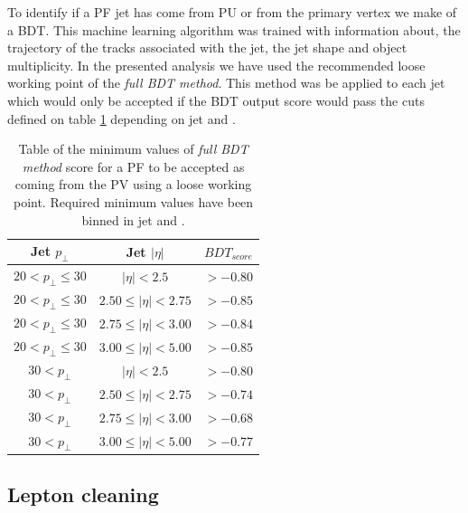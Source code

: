 To identify if a \gls{PF} jet has come from \gls{PU} or from the primary vertex we make of a \gls{BDT}. This machine learning algorithm was trained with information about, the trajectory of the tracks associated with the jet, the jet shape and object multiplicity. In the presented analysis we have used the recommended loose working point of the \textit{full \gls{BDT} method}. This method was be applied to each jet which would only be accepted if the \gls{BDT} output score would pass the cuts defined on table \ref{TABLE:EventReconstructionAndSimulation_PileupJetIDFullBDTLooseWorkingPoint} depending on jet \pt and \eta.

\begin{table}[!htb]
\centering
\begin{tabular}{|c|c|c|}
\hline
Jet $p_{\perp}$ & Jet $|\eta|$ & $BDT_{score}$ \\
\hline \hline
$20 < p_{\perp} \leq 30$ & $|\eta| < 2.5$            & $> -0.80$ \\
$20 < p_{\perp} \leq 30$ & $2.50 \leq |\eta| < 2.75$ & $> -0.85$ \\
$20 < p_{\perp} \leq 30$ & $2.75 \leq |\eta| < 3.00$ & $> -0.84$ \\
$20 < p_{\perp} \leq 30$ & $3.00 \leq |\eta| < 5.00$ & $> -0.85$ \\
$30 < p_{\perp}$         & $|\eta| < 2.5$            & $> -0.80$ \\
$30 < p_{\perp}$         & $2.50 \leq |\eta| < 2.75$ & $> -0.74$ \\
$30 < p_{\perp}$         & $2.75 \leq |\eta| < 3.00$ & $> -0.68$ \\
$30 < p_{\perp}$         & $3.00 \leq |\eta| < 5.00$ & $> -0.77$ \\
\hline
\end{tabular}
\caption{Table of the minimum values of \textit{full \gls{BDT} method} score for a \gls{PF} to be accepted as coming from the \gls{PV} using a loose working point. Required minimum values have been binned in jet \pt and \eta.}
\label{TABLE:EventReconstructionAndSimulation_PileupJetIDFullBDTLooseWorkingPoint}
\end{table}

\subsection{Lepton cleaning}
\label{SECTION:EventReconstructionAndSimulation_Jets_LeptonCleaning}

